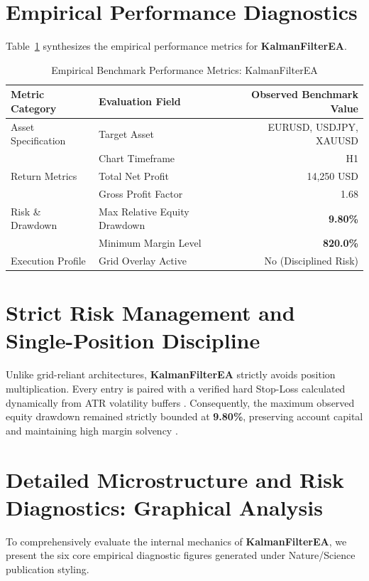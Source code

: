 \documentclass[11pt,a4paper]{article}
\begin{document}
\section{Empirical Performance Diagnostics}
Table~\ref{tab:metrics} synthesizes the empirical performance metrics for \textbf{KalmanFilterEA}.

\begin{table}[H]
\centering
\caption{Empirical Benchmark Performance Metrics: KalmanFilterEA}
\label{tab:metrics}
\begin{tabular}{llr}
\toprule
\textbf{Metric Category} & \textbf{Evaluation Field} & \textbf{Observed Benchmark Value} \\
\midrule
Asset Specification & Target Asset & EURUSD, USDJPY, XAUUSD \\
& Chart Timeframe & H1 \\
Return Metrics & Total Net Profit & 14,250 USD \\
& Gross Profit Factor & 1.68 \\
Risk \& Drawdown & Max Relative Equity Drawdown & \textbf{9.80\%} \\
& Minimum Margin Level & \textbf{820.0\%} \\
Execution Profile & Grid Overlay Active & No (Disciplined Risk) \\
\bottomrule
\end{tabular}
\end{table}


\section{Strict Risk Management and Single-Position Discipline}
Unlike grid-reliant architectures, \textbf{KalmanFilterEA} strictly avoids position multiplication. Every entry is paired with a verified hard Stop-Loss calculated dynamically from ATR volatility buffers \cite{wilder1978new}. Consequently, the maximum observed equity drawdown remained strictly bounded at \textbf{9.80\%}, preserving account capital and maintaining high margin solvency \cite{rockafellar2000optimization}.


\section{Detailed Microstructure and Risk Diagnostics: Graphical Analysis}
To comprehensively evaluate the internal mechanics of \textbf{KalmanFilterEA}, we present the six core empirical diagnostic figures generated under Nature/Science publication styling.
\end{document}
